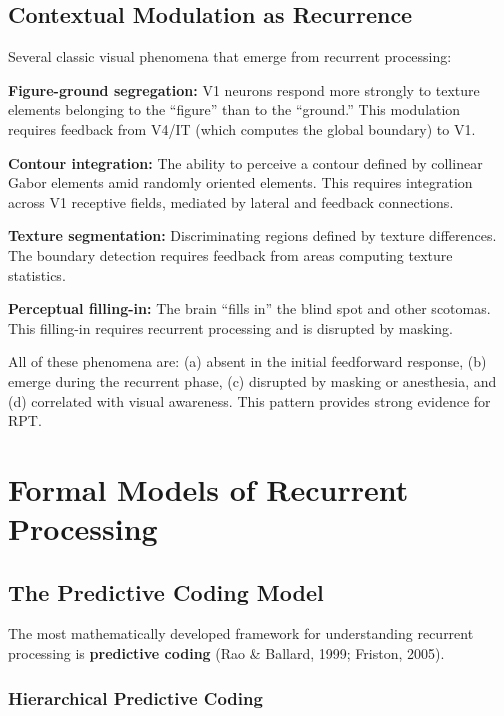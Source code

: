 \documentclass[11pt,a4paper]{report}
\begin{document}
\section{Contextual Modulation as Recurrence}

Several classic visual phenomena that emerge from recurrent processing:

\textbf{Figure-ground segregation:} V1 neurons respond more strongly to texture elements belonging to the ``figure'' than to the ``ground.'' This modulation requires feedback from V4/IT (which computes the global boundary) to V1.

\textbf{Contour integration:} The ability to perceive a contour defined by collinear Gabor elements amid randomly oriented elements. This requires integration across V1 receptive fields, mediated by lateral and feedback connections.

\textbf{Texture segmentation:} Discriminating regions defined by texture differences. The boundary detection requires feedback from areas computing texture statistics.

\textbf{Perceptual filling-in:} The brain ``fills in'' the blind spot and other scotomas. This filling-in requires recurrent processing and is disrupted by masking.

All of these phenomena are: (a) absent in the initial feedforward response, (b) emerge during the recurrent phase, (c) disrupted by masking or anesthesia, and (d) correlated with visual awareness. This pattern provides strong evidence for RPT.


\chapter{Formal Models of Recurrent Processing}

\section{The Predictive Coding Model}

The most mathematically developed framework for understanding recurrent processing is \textbf{predictive coding} (Rao \& Ballard, 1999; Friston, 2005).

\subsection{Hierarchical Predictive Coding}
\end{document}
